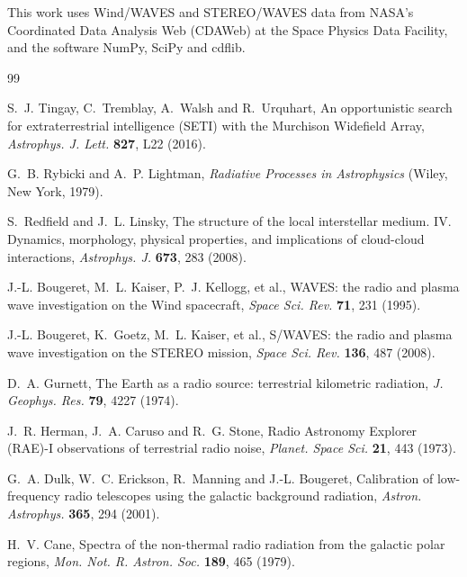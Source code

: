 \documentclass[3p,11pt]{elsarticle}
\begin{document}
This work uses Wind/WAVES and STEREO/WAVES data from NASA's Coordinated Data Analysis Web
(CDAWeb) at the Space Physics Data Facility, and the software NumPy, SciPy and cdflib.

\begin{thebibliography}{99}\small\raggedright
\setlength{\itemsep}{1pt}

S.~J. Tingay, C.~Tremblay, A.~Walsh and R.~Urquhart, An opportunistic search for
extraterrestrial intelligence (SETI) with the Murchison Widefield Array,
\emph{Astrophys. J. Lett.} \textbf{827}, L22 (2016).

G.~B. Rybicki and A.~P. Lightman, \emph{Radiative Processes in Astrophysics} (Wiley, New
York, 1979).

S.~Redfield and J.~L. Linsky, The structure of the local interstellar medium. IV.
Dynamics, morphology, physical properties, and implications of cloud-cloud
interactions, \emph{Astrophys. J.} \textbf{673}, 283 (2008).

J.-L. Bougeret, M.~L. Kaiser, P.~J. Kellogg, et al., WAVES: the radio and plasma wave
investigation on the Wind spacecraft, \emph{Space Sci. Rev.} \textbf{71}, 231 (1995).

J.-L. Bougeret, K.~Goetz, M.~L. Kaiser, et al., S/WAVES: the radio and plasma wave
investigation on the STEREO mission, \emph{Space Sci. Rev.} \textbf{136}, 487 (2008).

D.~A. Gurnett, The Earth as a radio source: terrestrial kilometric radiation, \emph{J.
Geophys. Res.} \textbf{79}, 4227 (1974).

J.~R. Herman, J.~A. Caruso and R.~G. Stone, Radio Astronomy Explorer (RAE)-I
observations of terrestrial radio noise, \emph{Planet. Space Sci.} \textbf{21}, 443
(1973).

G.~A. Dulk, W.~C. Erickson, R.~Manning and J.-L. Bougeret, Calibration of low-frequency
radio telescopes using the galactic background radiation, \emph{Astron. Astrophys.}
\textbf{365}, 294 (2001).

H.~V. Cane, Spectra of the non-thermal radio radiation from the galactic polar regions,
\emph{Mon. Not. R. Astron. Soc.} \textbf{189}, 465 (1979).

\end{thebibliography}
\end{document}
